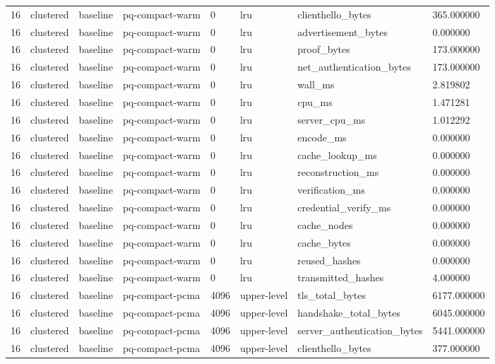 \begin{tabular}{llllllll}
16 & clustered & baseline & pq-compact-warm & 0 & lru & clienthello\_bytes & 365.000000 \\
16 & clustered & baseline & pq-compact-warm & 0 & lru & advertisement\_bytes & 0.000000 \\
16 & clustered & baseline & pq-compact-warm & 0 & lru & proof\_bytes & 173.000000 \\
16 & clustered & baseline & pq-compact-warm & 0 & lru & net\_authentication\_bytes & 173.000000 \\
16 & clustered & baseline & pq-compact-warm & 0 & lru & wall\_ms & 2.819802 \\
16 & clustered & baseline & pq-compact-warm & 0 & lru & cpu\_ms & 1.471281 \\
16 & clustered & baseline & pq-compact-warm & 0 & lru & server\_cpu\_ms & 1.012292 \\
16 & clustered & baseline & pq-compact-warm & 0 & lru & encode\_ms & 0.000000 \\
16 & clustered & baseline & pq-compact-warm & 0 & lru & cache\_lookup\_ms & 0.000000 \\
16 & clustered & baseline & pq-compact-warm & 0 & lru & reconstruction\_ms & 0.000000 \\
16 & clustered & baseline & pq-compact-warm & 0 & lru & verification\_ms & 0.000000 \\
16 & clustered & baseline & pq-compact-warm & 0 & lru & credential\_verify\_ms & 0.000000 \\
16 & clustered & baseline & pq-compact-warm & 0 & lru & cache\_nodes & 0.000000 \\
16 & clustered & baseline & pq-compact-warm & 0 & lru & cache\_bytes & 0.000000 \\
16 & clustered & baseline & pq-compact-warm & 0 & lru & reused\_hashes & 0.000000 \\
16 & clustered & baseline & pq-compact-warm & 0 & lru & transmitted\_hashes & 4.000000 \\
16 & clustered & baseline & pq-compact-pcma & 4096 & upper-level & tls\_total\_bytes & 6177.000000 \\
16 & clustered & baseline & pq-compact-pcma & 4096 & upper-level & handshake\_total\_bytes & 6045.000000 \\
16 & clustered & baseline & pq-compact-pcma & 4096 & upper-level & server\_authentication\_bytes & 5441.000000 \\
16 & clustered & baseline & pq-compact-pcma & 4096 & upper-level & clienthello\_bytes & 377.000000 \\

\end{tabular}
